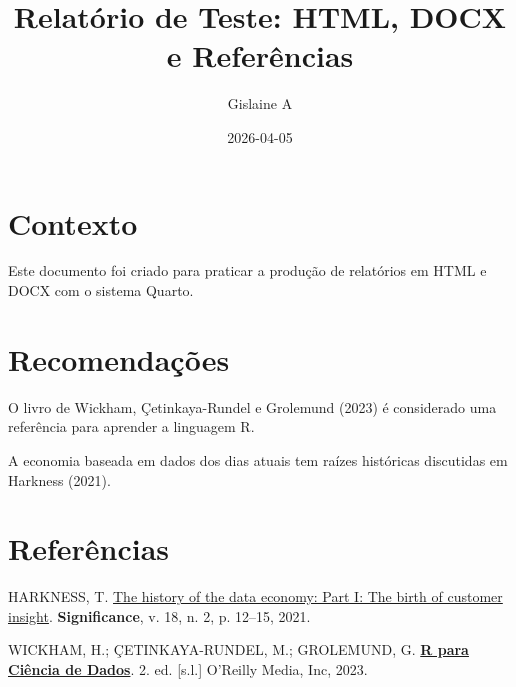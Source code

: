 \documentclass[
  brazilian,
  letterpaper,
  DIV=11,
  numbers=noendperiod]{scrartcl}
\title{Relatório de Teste: HTML, DOCX e Referências}
\author{Gislaine A}
\date{2026-04-05}
\newlength{\cslhangindent}
\newenvironment{CSLReferences}[2] %
 {\begin{list}{}{%
  \setlength{\itemindent}{0pt}
  \setlength{\leftmargin}{0pt}
  \setlength{\parsep}{0pt}
  \ifodd #1
   \setlength{\leftmargin}{\cslhangindent}
   \setlength{\itemindent}{-1\cslhangindent}
  \fi
  \setlength{\itemsep}{#2\baselineskip}}}
 {\end{list}}
\begin{document}
\maketitle


\section{Contexto}\label{contexto}

Este documento foi criado para praticar a produção de relatórios em HTML
e DOCX com o sistema Quarto.

\section{Recomendações}\label{recomendauxe7uxf5es}

O livro de Wickham, Çetinkaya-Rundel e Grolemund (2023) é considerado
uma referência para aprender a linguagem R.

A economia baseada em dados dos dias atuais tem raízes históricas
discutidas em Harkness (2021).

\section{Referências}\label{referuxeancias}

\label{refs}
\begin{CSLReferences}{0}{0}
HARKNESS, T. \href{https://doi.org/10.1111/1740-9713.01504}{The history
of the data economy: Part I: The birth of customer insight}.
\textbf{Significance}, v. 18, n. 2, p. 12--15, 2021.

WICKHAM, H.; ÇETINKAYA-RUNDEL, M.; GROLEMUND, G.
\textbf{\href{http://pt.r4ds.hadley.nz}{R para Ciência de Dados}}. 2.
ed. {[}s.l.{]} O'Reilly Media, Inc, 2023.

\end{CSLReferences}
\end{document}
